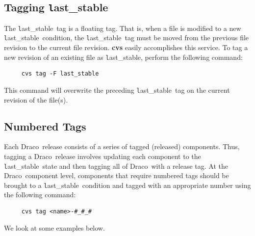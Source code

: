 \documentclass[11pt]{nmemo}
\newcommand{\draco}{{\normalfont\normalsize\textsf Draco}}
\newcommand{\stable}{{\normalfont\normalsize\texttt last\_stable}}
\begin{document}
\subsection{Tagging \stable}

The \stable\ tag is a floating tag.  That is, when a file is modified
to a new \stable\ condition, the \stable\ tag must be moved from the
previous file revision to the current file revision.  {\bf cvs} easily 
accomplishes this service.  To tag a new revision of an existing file
as \stable, perform the following command:
\begin{verbatim}
     cvs tag -F last_stable
\end{verbatim}
This command will overwrite the preceding \stable\ tag on the current
revision of the file(s).

\subsection{Numbered Tags}

Each \draco\ release consists of a series of tagged (released)
components.  Thus, tagging a \draco\ release involves updating each
component to the \stable\ state and then tagging all of \draco\ with a
release tag.  At the \draco\ component level, components that require
numbered tags should be brought to a \stable\ condition and tagged
with an appropriate number using the following command:
\begin{verbatim}
     cvs tag <name>-#_#_#
\end{verbatim}
We look at some examples below.
\end{document}
